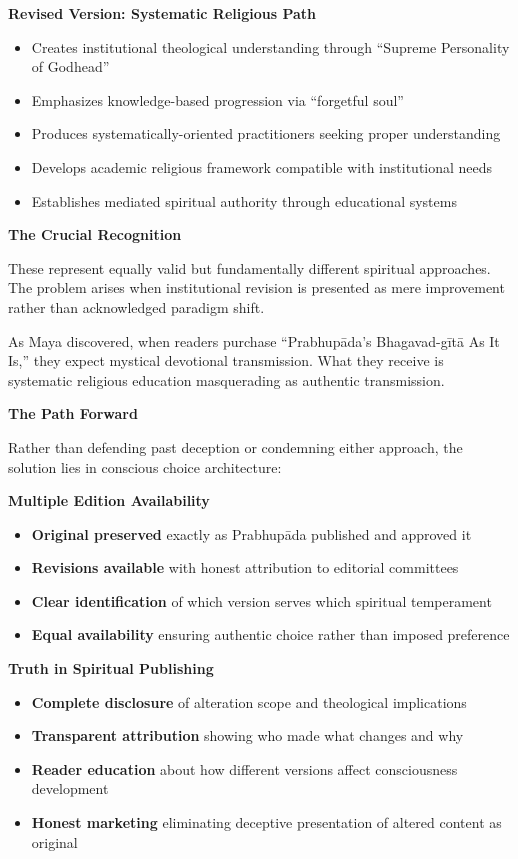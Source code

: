 \documentclass[11pt,twoside]{book}
\begin{document}
\textbf{Revised Version: Systematic Religious Path}
\begin{itemize}
\item Creates institutional theological understanding through ``Supreme Personality of Godhead''
\item Emphasizes knowledge-based progression via ``forgetful soul''
\item Produces systematically-oriented practitioners seeking proper understanding
\item Develops academic religious framework compatible with institutional needs
\item Establishes mediated spiritual authority through educational systems
\end{itemize}

\textbf{The Crucial Recognition}

These represent equally valid but fundamentally different spiritual approaches. The problem arises when institutional revision is presented as mere improvement rather than acknowledged paradigm shift.

As Maya discovered, when readers purchase ``Prabhupāda's Bhagavad-gītā As It Is,'' they expect mystical devotional transmission. What they receive is systematic religious education masquerading as authentic transmission.

\textbf{The Path Forward}

Rather than defending past deception or condemning either approach, the solution lies in conscious choice architecture:

\textbf{Multiple Edition Availability}
\begin{itemize}
\item \textbf{Original preserved} exactly as Prabhupāda published and approved it
\item \textbf{Revisions available} with honest attribution to editorial committees
\item \textbf{Clear identification} of which version serves which spiritual temperament
\item \textbf{Equal availability} ensuring authentic choice rather than imposed preference
\end{itemize}

\textbf{Truth in Spiritual Publishing}
\begin{itemize}
\item \textbf{Complete disclosure} of alteration scope and theological implications
\item \textbf{Transparent attribution} showing who made what changes and why
\item \textbf{Reader education} about how different versions affect consciousness development
\item \textbf{Honest marketing} eliminating deceptive presentation of altered content as original
\end{itemize}
\end{document}
